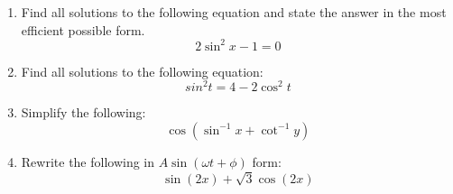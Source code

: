 \documentclass[letterpaper,12pt,fleqn]{article}
\newcommand{\w}{\omega}
\newcommand{\p}{\phi}
\begin{document}
\begin{enumerate}

  \newpage
  
\item Find all solutions to the following equation and state the answer in the
  most efficient possible form.
  \[2\sin^2x-1=0\]

  \vspace{3in}

\item Find all solutions to the following equation:
  \[sin^2t=4-2\cos^2t\]

  \newpage

\item Simplify the following:
  \[\cos(\sin^{-1}x+\cot^{-1}y)\]

  \vspace{3.5in}

\item Rewrite the following in $A\sin(\w t+\p)$ form:
  \[\sin(2x)+\sqrt{3}\cos(2x)\]
\end{enumerate}
\end{document}
